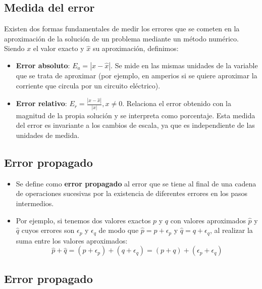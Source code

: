 \documentclass[openany]{book}
\providecommand{\tightlist}{%
  \setlength{\itemsep}{0pt}\setlength{\parskip}{0pt}}
\begin{document}
\hypertarget{medida-del-error}{%
\subsection{Medida del error}\label{medida-del-error}}

Existen dos formas fundamentales de medir los errores que se cometen en la aproximación de la solución de un problema mediante un método numérico. Siendo \(x\) el valor exacto y \(\hat{x}\) su aproximación, definimos:

\begin{itemize}
\item
  \textbf{Error absoluto}: \(E_a = |x - \hat{x}|\). Se mide en las mismas unidades de la variable que se trata de aproximar (por ejemplo, en amperios si se quiere aproximar la corriente que circula por un circuito eléctrico).
\item
  \textbf{Error relativo}: \(E_r = \frac{|x - \hat{x}|}{|x|}, x\neq 0\). Relaciona el error obtenido con la magnitud de la propia solución y se interpreta como porcentaje. Esta medida del error es invariante a los cambios de escala, ya que es independiente de las unidades de medida.
\end{itemize}

\hypertarget{error-propagado}{%
\subsection{Error propagado}\label{error-propagado}}

\begin{itemize}
\tightlist
\item
  Se define como \textbf{error propagado} al error que se tiene al final de una cadena de operaciones sucesivas por la existencia de diferentes errores en los pasos intermedios.
\item
  Por ejemplo, si tenemos dos valores exactos \(p\) y \(q\) con valores aproximados \(\hat{p}\) y \(\hat{q}\) cuyos errores son \(\epsilon_p\) y \(\epsilon_q\) de modo que \(\hat{p} = p + \epsilon_p\) y \(\hat{q} = q + \epsilon_q\), al realizar la suma entre los valores aproximados:
  \[\hat{p} + \hat{q} = (p + \epsilon_p) + (q + \epsilon_q) = (p + q) + (\epsilon_p + \epsilon_q)\]
\end{itemize}

\hypertarget{error-propagado-1}{%
\subsection{Error propagado}\label{error-propagado-1}}
\end{document}

